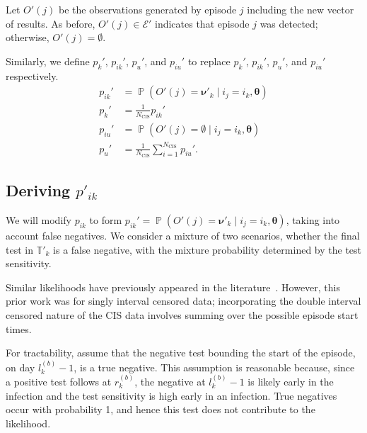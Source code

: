 \documentclass[12pt]{article}
\DeclareMathOperator{\prob}{\mathbb{P}}
\newcommand\set{\mathcal}
\renewcommand{\vec}[1]{\bm{#1}}
\newcommand{\Ncis}{N_\text{CIS}}
\newcommand{\sched}{\mathbb{T}}
\begin{document}
Let $O'(j)$ be the observations generated by episode $j$ including the new vector of results.
As before, $O'(j) \in \set{E}'$ indicates that episode $j$ was detected; otherwise, $O'(j) = \emptyset$.

Similarly, we define $p_k'$, $p_{ik}'$, $p_u'$, and $p_{iu}'$ to replace $p_k'$, $p_{ik}'$, $p_u'$, and $p_{iu}'$ respectively.
\begin{align}
    p_{ik}' &= \prob(O'(j) = \vec{\nu}'_k \mid i_j = i_k, \vec{\theta}) \\
    p_k' &= \frac{1}{\Ncis} p_{ik}' \\
    p_{iu}' &= \prob(O'(j) = \emptyset \mid i_j = i_k, \vec{\theta}) \\
    p_u' &= \frac{1}{\Ncis} \sum_{i=1}^{\Ncis} p_{iu}'.
\end{align}

\subsection{Deriving $p'_{ik}$} \label{imperf-test:sec:modifying-p_ia}

We will modify $p_{ik}$ to form $p_{ik}' = \prob(O'(j) = \vec{\nu}'_k \mid i_j = i_k, \vec{\theta})$, taking into account false negatives.
We consider a mixture of two scenarios, whether the final test in $\sched'_{k}$ is a false negative, with the mixture probability determined by the test sensitivity.

Similar likelihoods have previously appeared in the literature~\citep[e.g.][eq.\ (2)]{piresIntervalMisclassify}.
However, this prior work was for singly interval censored data; incorporating the double interval censored nature of the CIS data involves summing over the possible episode start times.


For tractability, assume that the negative test bounding the start of the episode, on day $l_k^{(b)}-1$, is a true negative.
This assumption is reasonable because, since a positive test follows at $r_k^{(b)}$, the negative at $l_k^{(b)}-1$ is likely early in the infection and the test sensitivity is high early in an infection.
True negatives occur with probability 1, and hence this test does not contribute to the likelihood.
\end{document}
